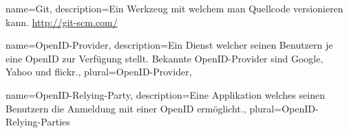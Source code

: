 {
    name=Git,
    description={Ein Werkzeug mit welchem man Quellcode versionieren kann. \url{http://git-scm.com/}}
}

{
    name=OpenID-Provider,
    description={Ein Dienst welcher seinen Benutzern je eine OpenID zur Verfügung stellt. Bekannte OpenID-Provider sind Google, Yahoo und flickr.},
    plural=OpenID-Provider,
}

{
    name=OpenID-Relying-Party,
    description={Eine Applikation welches seinen Benutzern die Anmeldung mit
                 einer OpenID ermöglicht.},
    plural=OpenID-Relying-Parties 
}

